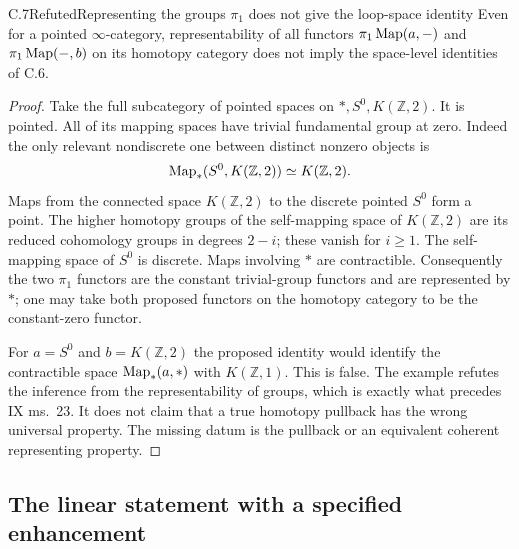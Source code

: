 \begin{result}{C.7}{Refuted}{Representing the groups $\pi_1$ does not give the loop-space identity}
Even for a pointed $\infty$-category, representability of all functors $\pi_1\operatorname{Map}(a,-)$ and $\pi_1\operatorname{Map}(-,b)$ on its homotopy category does not imply the space-level identities of C.6.
\end{result}
\begin{proof}
Take the full subcategory of pointed spaces on $*,S^0,K(\mathbb Z,2)$. It is pointed. All of its mapping spaces have trivial fundamental group at zero. Indeed the only relevant nondiscrete one between distinct nonzero objects is
\[
 \operatorname{Map}_*(S^0,K(\mathbb Z,2))\simeq K(\mathbb Z,2).
\]
Maps from the connected space $K(\mathbb Z,2)$ to the discrete pointed $S^0$ form a point. The higher homotopy groups of the self-mapping space of $K(\mathbb Z,2)$ are its reduced cohomology groups in degrees $2-i$; these vanish for $i\geq1$. The self-mapping space of $S^0$ is discrete. Maps involving $*$ are contractible. Consequently the two $\pi_1$ functors are the constant trivial-group functors and are represented by $*$; one may take both proposed functors on the homotopy category to be the constant-zero functor.

For $a=S^0$ and $b=K(\mathbb Z,2)$ the proposed identity would identify the contractible space $\operatorname{Map}_*(a,*)$ with $K(\mathbb Z,1)$. This is false. The example refutes the inference from the representability of groups, which is exactly what precedes IX ms.~23. It does not claim that a true homotopy pullback has the wrong universal property. The missing datum is the pullback or an equivalent coherent representing property.
\end{proof}

\subsection{The linear statement with a specified enhancement}

